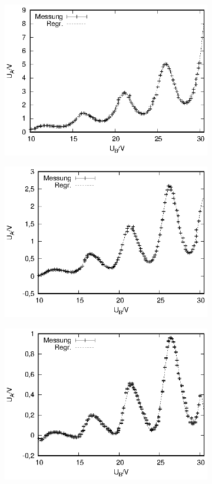 \begin{figure}[h!]
  \centering
  \begin{subfigure}[h]{0.5\textwidth}
    \centering
    \includegraphics{data/fh/165K1V.eps}
  \end{subfigure}%
  \begin{subfigure}[h]{0.5\textwidth}
    \centering
    \includegraphics{data/fh/165K2V.eps}
  \end{subfigure}
    \begin{subfigure}[h]{0.5\textwidth}
    \centering
    \includegraphics{data/fh/165K3V.eps}

\end{subfigure}
\end{figure}
